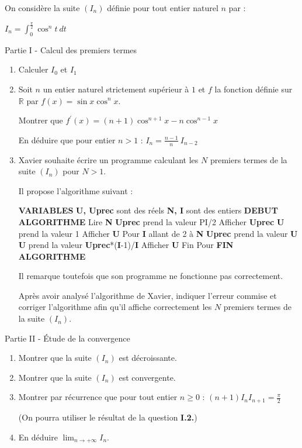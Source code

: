 
%
On considère la suite $(I_n)$ définie pour tout entier naturel $n$ par :
\par
$I_n= \int_0^{ \frac{ \pi } {2}}\cos^nt\ dt $
\begin{h3}Partie I - Calcul des premiers termes\end{h3}
\begin{enumerate}
     \item
     Calculer $I_0$ et $I_1$
     \item
     Soit $n$ un entier naturel strictement supérieur à $1$ et $f$ la fonction définie sur $\mathbb{R}$ par $f(x)=\sin x\cos^{n}x$.
     \par
     Montrer que $f^{\prime}(x)=(n+1)\cos^{n+1} x-n\cos^{n-1}x$
     \par
     En déduire que pour entier $n > 1$ : $I_n= \frac{n-1}{n}\ I_{n-2} $
     \item
     Xavier souhaite écrire un programme calculant les $N$ premiers termes de la suite $(I_n)$ pour $N > 1$.
     \par
     Il propose l'algorithme suivant :
\begin{code}
  \textbf{VARIABLES}
        \textbf{U, Uprec} sont des réels
        \textbf{N, I} sont des entiers
     \textbf{DEBUT ALGORITHME}
        Lire \textbf{N}
        \textbf{Uprec} prend la valeur PI/2
        Afficher \textbf{Uprec}
        \textbf{U} prend la valeur 1
        Afficher \textbf{U}
        Pour \textbf{I} allant de 2 à \textbf{N}
           \textbf{Uprec} prend la valeur \textbf{U}
           \textbf{U} prend la valeur \textbf{Uprec}*(\textbf{I}-1)/\textbf{I}
           Afficher \textbf{U}
        Fin Pour
     \textbf{FIN ALGORITHME}
\end{code}



Il remarque toutefois que son programme ne fonctionne pas correctement.
\par
Après avoir analysé l'algorithme de Xavier, indiquer l'erreur commise et corriger l'algorithme afin qu'il affiche correctement les $N$ premiers termes de la suite $(I_n)$.
\end{enumerate}
\begin{h3}Partie II - Étude de la convergence\end{h3}
\begin{enumerate}
     \item
     Montrer que la suite $(I_n)$ est décroissante.
     \item
     Montrer que la suite $(I_n)$ est convergente.
     \item
     Montrer par récurrence que pour tout entier $n  \geqslant 0$ : $\left(n+1\right)I_nI_{n+1}= \frac{ \pi }{2} $
     \par
     (On pourra utiliser le résultat de la question \textbf{I.2.})
     \item
     En déduire $ \lim_{n \rightarrow  +\infty  }  I_n$.
\end{enumerate}
\begin{corrige}
 
\end{corrige}

